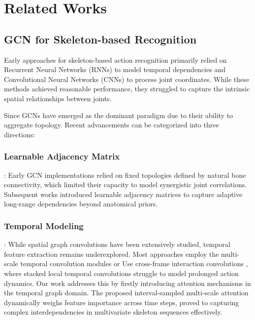 \section{Related Works}

\subsection{GCN for Skeleton-based Recognition}

Early approaches for skeleton-based action recognition primarily 
relied on Recurrent Neural Networks (RNNs) \cite{ref4,ref5} to model 
temporal dependencies and Convolutional Neural Networks (CNNs) 
\cite{ref6} to process joint coordinates. While these methods achieved 
reasonable performance, they struggled to capture the intrinsic spatial 
relationships between joints.

Since GCNs \cite{ref7,ref8} have emerged as the dominant 
paradigm due to their ability to aggregate topology. Recent 
advancements can be categorized into three directions:

\subsubsection{Learnable Adjacency Matrix}: Early GCN implementations
 \cite{ref7} relied on fixed topologies defined by natural bone 
 connectivity, which limited their capacity to model synergistic joint 
 correlations. Subsequent works \cite{ref8,ref9,ref10,ref11,re12,ref14,ref15,ref16} introduced learnable 
 adjacency matrices to capture adaptive long-range dependencies beyond 
 anatomical priors.

\subsubsection{Temporal Modeling}: While spatial graph convolutions 
have been extensively studied, temporal feature extraction remains 
underexplored. Most approaches employ the multi-scale 
temporal convolution modules \cite{ref9,ref10,ref11,ref12,ref13} or Use cross-frame 
interaction convolutions \cite{ref15}, where stacked local temporal convolutions 
struggle to model prolonged action dynamics. Our work addresses this by
firstly introducing attention mechanisms in the temporal graph domain. The 
proposed interval-sampled multi-scale attention dynamically weighs 
feature importance across time steps, proved to capturing complex 
interdependencies in multivariate skeleton sequences effectively. 

